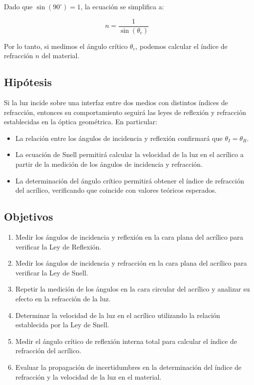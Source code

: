 \documentclass[article,12pt]{elsarticle}
\begin{document}
Dado que $\sin(90^\circ) = 1$, la ecuación se simplifica a:

\begin{mdframed}
\begin{equation}
n = \frac{1}{\sin(\theta_c)}
\end{equation}
\end{mdframed}

Por lo tanto, si medimos el ángulo crítico $\theta_c$, podemos calcular el índice de refracción $n$ del material.




\subsection{Hipótesis}

Si la luz incide sobre una interfaz entre dos medios con distintos índices de refracción, entonces su comportamiento seguirá las leyes de reflexión y refracción establecidas en la óptica geométrica. En particular:
\begin{itemize}
\item La relación entre los ángulos de incidencia y reflexión confirmará que $\theta_I = \theta_R$.
\item La ecuación de Snell permitirá calcular la velocidad de la luz en el acrílico a partir de la medición de los ángulos de incidencia y refracción.
\item La determinación del ángulo crítico permitirá obtener el índice de refracción del acrílico, verificando que coincide con valores teóricos esperados.
\end{itemize}



\subsection{Objetivos}

\begin{enumerate}

\item Medir los ángulos de incidencia y reflexión en la cara plana del acrílico para verificar la Ley de Reflexión.
\item Medir los ángulos de incidencia y refracción en la cara plana del acrílico para verificar la Ley de Snell.
\item Repetir la medición de los ángulos en la cara circular del acrílico y analizar su efecto en la refracción de la luz.
\item Determinar la velocidad de la luz en el acrílico utilizando la relación establecida por la Ley de Snell.
\item Medir el ángulo crítico de reflexión interna total para calcular el índice de refracción del acrílico.
\item Evaluar la propagación de incertidumbres en la determinación del índice de refracción y la velocidad de la luz en el material.
\end{enumerate}
\end{document}
